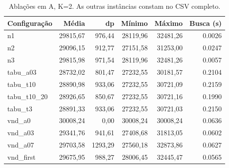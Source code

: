 \begin{table}[ht]
\centering\small
\caption{Ablações em A, K=2. As outras instâncias constam no CSV completo.}
\begin{tabular}{lrrrrr}
\hline Configuração & Média & dp & Mínimo & Máximo & Busca (s) \\ \hline
n1 & 29815,67 & 976,44 & 28119,96 & 32481,26 & 0.0026 \\
n2 & 29096,15 & 912,77 & 27151,58 & 31253,00 & 0.0247 \\
n3 & 29815,98 & 971,54 & 28119,96 & 32481,26 & 0.0057 \\
tabu\_a03 & 28732,02 & 801,47 & 27232,55 & 30181,57 & 0.2104 \\
tabu\_t10 & 28890,98 & 933,06 & 27232,55 & 30721,09 & 0.2159 \\
tabu\_t10\_20 & 28926,65 & 850,67 & 27232,55 & 30721,16 & 0.1990 \\
tabu\_t3 & 28891,33 & 933,06 & 27232,55 & 30721,03 & 0.2150 \\
vnd\_a0 & 30008,24 & 0,00 & 30008,24 & 30008,24 & 0.0636 \\
vnd\_a03 & 29341,76 & 941,61 & 27408,68 & 31813,05 & 0.0602 \\
vnd\_a07 & 29703,58 & 1293,29 & 27560,18 & 32873,86 & 0.0627 \\
vnd\_first & 29675,95 & 988,27 & 28006,45 & 32445,47 & 0.0565 \\
\hline\end{tabular}
\label{tab:ablacoes}
\end{table}
